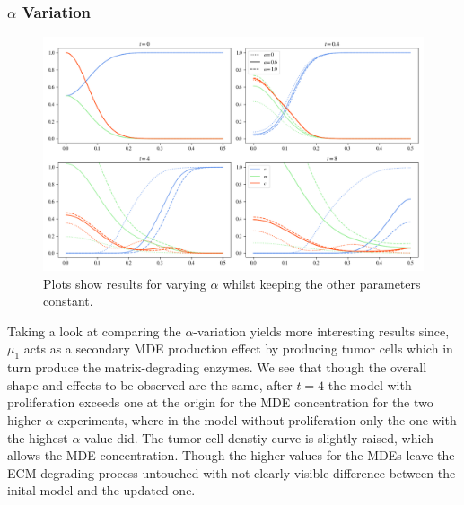 \subsubsection*{$\alpha$ Variation}
\begin{figure}[h]
    \centering
    \includegraphics[width=\textwidth]{resources/images/prolif_alpha_variation.png}
    \caption{Plots show results for varying $\alpha$ whilst keeping the other parameters constant.}
    \label{fig:prolif_alpha_variation}
\end{figure}

Taking a look at comparing the $\alpha$-variation yields more interesting results since, $\mu_1$ acts as a secondary MDE production effect by producing tumor cells which in turn produce the matrix-degrading enzymes. We see that though the overall shape and effects to be observed are the same, after $t=4$ the model with proliferation exceeds one at the origin for the MDE concentration for the two higher $\alpha$ experiments, where in the model without proliferation only the one with the highest $\alpha$ value did. The tumor cell denstiy curve is slightly raised, which allows the MDE concentration. Though the higher values for the MDEs leave the ECM degrading process untouched with not clearly visible difference between the inital model and the updated one. 

